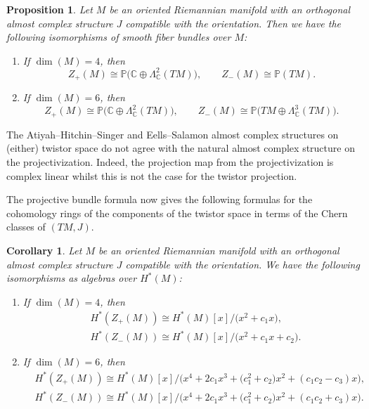 \documentclass[11pt]{article}
\numberwithin{equation}{section}
\newcommand{\C}{\mathbb{C}}
\numberwithin{equation}{section}
\newtheorem{Corollary}[Theorem]{Corollary}
\newtheorem{Proposition}[Theorem]{Proposition}
 { \theoremstyle{definition}
\newtheorem{Definition}[Theorem]{Definition}
\newtheorem{Note}[Theorem]{Note}
\newtheorem{Example}[Theorem]{Example}
\newtheorem{Remark}[Theorem]{Remark} }
\begin{document}
\begin{Proposition}\label{identification}
Let $M$ be an oriented Riemannian manifold with an orthogonal almost complex structure $J$ compatible with the orientation. Then we have the following isomorphisms of smooth fiber bundles over $M$:
\begin{enumerate}\itemsep=0pt
\item[$1.$] If $\dim(M)=4$, then
\[
Z_+(M) \cong \mathbb{P}\big( \C \oplus \Lambda^2_\C(TM)\big), \qquad Z_{-}(M) \cong \mathbb{P}( TM).
\]
\item[$2.$] If $\dim(M)=6$, then
\[
Z_+(M) \cong \mathbb{P}\big( \C \oplus \Lambda^2_\C(TM)\big), \qquad Z_{-}(M) \cong \mathbb{P}\big( TM \oplus \Lambda_\C^3(TM)\big).
\]
\end{enumerate}
\end{Proposition}

\begin{Remark}
 The Atiyah--Hitchin--Singer and Eells--Salamon almost complex structures on (either) twistor space do not agree with the natural almost complex structure on the projectivization. Indeed, the projection map from the projectivization is complex linear whilst this is not the case for the twistor projection.
\end{Remark}

The projective bundle formula now gives the following formulas for the cohomology rings of the components of the twistor space in terms of the
Chern classes of $(TM, J)$.

\begin{Corollary}
\label{cohomtwis}
Let $M$ be an oriented Riemannian manifold with an orthogonal almost complex structure $J$ compatible with the orientation. We have the following isomorphisms as algebras over $H^*(M)$:
\begin{enumerate}\itemsep=0pt
\item[$1.$] If $\dim(M)=4$, then
\begin{align*}
&H^*(Z_+(M))\cong H^*(M)[x]/\big(x^2+c_1 x\big), \\
&H^*(Z_{-}(M))\cong H^*(M)[x]/\big(x^2 + c_1 x + c_2\big).
\end{align*}
\item[$2.$] If $\dim(M)=6$, then
\begin{align*}
&H^*(Z_+(M))\cong H^*(M)[x]/\big(x^4 +2c_1x^3 +\big(c_1^2+c_2\big) x^2 + (c_1c_2-c_3)x\big), \\
&H^*(Z_{-}(M))\cong H^*(M)[x]/\big(x^4 + 2c_1x^3+ \big(c_1^2+c_2\big)x^2 + (c_1c_2+c_3)x\big). \end{align*}
\end{enumerate}
\end{Corollary}
\end{document}

